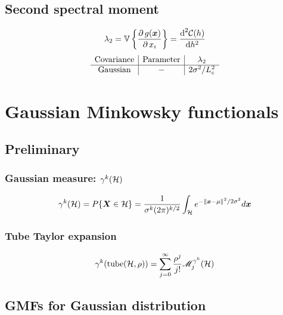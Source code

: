 \documentclass[a4paper,12pt]{article}
\begin{document}
\subsection{Second spectral moment}
\begin{equation}
  \lambda_2=\mathbb{V}\left\{\frac{\partial\, g(\boldsymbol{x})}{\partial\, x_i}\right\}= \frac{\text{d}^2\mathcal{C}(h)}{\text{d}h^2}
\end{equation}
\begin{equation}
  \begin{array}{c|c|c}
    \text{Covariance} & \text{Parameter} & \lambda_2 \\
    \hline
    \text{Gaussian} & - & 2\sigma^2/L_c^2\\
  \end{array}
\end{equation}

\section{Gaussian Minkowsky functionals}
\subsection{Preliminary}
\subsubsection{Gaussian measure: $\gamma^k(\mathcal{H})$}
\begin{equation}
  \gamma^k(\mathcal{H}) = P\{\boldsymbol{X}\in\mathcal{H}\}=\frac{1}{\sigma^k(2\pi)^{k/2}} \int_{\mathcal{H}} e^{-\|\boldsymbol{x}-\mu\|^2/2\sigma^2} d\boldsymbol{x}
\end{equation}
\subsubsection{Tube Taylor expansion}
\begin{equation}
  \gamma^k(\text{tube}(\mathcal{H},\rho))=\sum_{j=0}^{\infty} \frac{\rho^j}{j!}\mathscr{M}^{\gamma^k}_j(\mathcal{H})
\end{equation}

\subsection{GMFs for Gaussian distribution}
\end{document}
